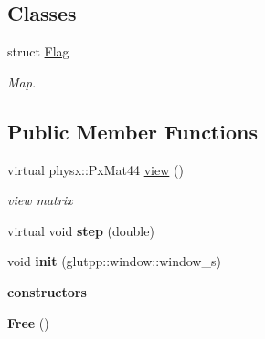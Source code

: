 \subsection*{Classes}
\begin{DoxyCompactItemize}
\item 
struct \hyperlink{structglutpp_1_1Camera_1_1View_1_1Free_1_1Flag}{Flag}
\begin{DoxyCompactList}\small\item\em Map. \end{DoxyCompactList}\end{DoxyCompactItemize}
\subsection*{Public Member Functions}
\begin{DoxyCompactItemize}
\item 
\hypertarget{classglutpp_1_1Camera_1_1View_1_1Free_a5f1648d4c0ad2289dd9e78f0b68b8a6c}{virtual physx\-::\-Px\-Mat44 \hyperlink{classglutpp_1_1Camera_1_1View_1_1Free_a5f1648d4c0ad2289dd9e78f0b68b8a6c}{view} ()}\label{classglutpp_1_1Camera_1_1View_1_1Free_a5f1648d4c0ad2289dd9e78f0b68b8a6c}

\begin{DoxyCompactList}\small\item\em view matrix \end{DoxyCompactList}\item 
\hypertarget{classglutpp_1_1Camera_1_1View_1_1Free_a2a117540633d55517305fa69cee5f336}{virtual void {\bfseries step} (double)}\label{classglutpp_1_1Camera_1_1View_1_1Free_a2a117540633d55517305fa69cee5f336}

\item 
\hypertarget{classglutpp_1_1Camera_1_1View_1_1Free_a393fcaeafad6d09a4a6ec28800ac9706}{void {\bfseries init} (glutpp\-::window\-::window\-\_\-s)}\label{classglutpp_1_1Camera_1_1View_1_1Free_a393fcaeafad6d09a4a6ec28800ac9706}

\end{DoxyCompactItemize}
\begin{Indent}{\bf constructors}\par
\begin{DoxyCompactItemize}
\item 
\hypertarget{classglutpp_1_1Camera_1_1View_1_1Free_a3038c31e5a7a43d6dbf2d286e24d91c9}{{\bfseries Free} ()}\label{classglutpp_1_1Camera_1_1View_1_1Free_a3038c31e5a7a43d6dbf2d286e24d91c9}

\end{DoxyCompactItemize}
\end{Indent}
